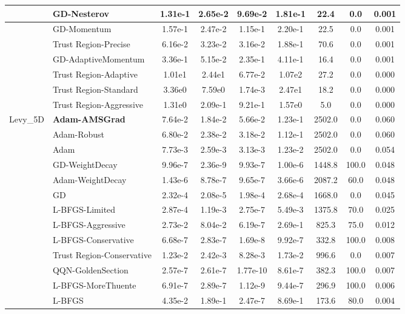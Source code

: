 \documentclass[10pt]{article}
\begin{document}
\begin{longtable}{|l|l|c|c|c|c|c|c|c|}
\hline
 & GD-Nesterov & 1.31e-1 & 2.65e-2 & 9.69e-2 & 1.81e-1 & 22.4 & 0.0 & 0.001 \\
\hline
 & GD-Momentum & 1.57e-1 & 2.47e-2 & 1.15e-1 & 2.20e-1 & 22.5 & 0.0 & 0.001 \\
\hline
 & Trust Region-Precise & 6.16e-2 & 3.23e-2 & 3.16e-2 & 1.88e-1 & 70.6 & 0.0 & 0.001 \\
\hline
 & GD-AdaptiveMomentum & 3.36e-1 & 5.15e-2 & 2.35e-1 & 4.11e-1 & 16.4 & 0.0 & 0.001 \\
\hline
 & Trust Region-Adaptive & 1.01e1 & 2.44e1 & 6.77e-2 & 1.07e2 & 27.2 & 0.0 & 0.000 \\
\hline
 & Trust Region-Standard & 3.36e0 & 7.59e0 & 1.74e-3 & 2.47e1 & 18.2 & 0.0 & 0.000 \\
\hline
 & Trust Region-Aggressive & 1.31e0 & 2.09e-1 & 9.21e-1 & 1.57e0 & 5.0 & 0.0 & 0.000 \\
Levy\_5D & \textbf{Adam-AMSGrad} & 7.64e-2 & 1.84e-2 & 5.66e-2 & 1.23e-1 & 2502.0 & 0.0 & 0.060 \\
\hline
 & Adam-Robust & 6.80e-2 & 2.38e-2 & 3.18e-2 & 1.12e-1 & 2502.0 & 0.0 & 0.060 \\
\hline
 & Adam & 7.73e-3 & 2.59e-3 & 3.13e-3 & 1.23e-2 & 2502.0 & 0.0 & 0.054 \\
\hline
 & GD-WeightDecay & 9.96e-7 & 2.36e-9 & 9.93e-7 & 1.00e-6 & 1448.8 & 100.0 & 0.048 \\
\hline
 & Adam-WeightDecay & 1.43e-6 & 8.78e-7 & 9.65e-7 & 3.66e-6 & 2087.2 & 60.0 & 0.048 \\
\hline
 & GD & 2.32e-4 & 2.08e-5 & 1.98e-4 & 2.68e-4 & 1668.0 & 0.0 & 0.045 \\
\hline
 & L-BFGS-Limited & 2.87e-4 & 1.19e-3 & 2.75e-7 & 5.49e-3 & 1375.8 & 70.0 & 0.025 \\
\hline
 & L-BFGS-Aggressive & 2.73e-2 & 8.04e-2 & 6.19e-7 & 2.69e-1 & 825.3 & 75.0 & 0.012 \\
\hline
 & L-BFGS-Conservative & 6.68e-7 & 2.83e-7 & 1.69e-8 & 9.92e-7 & 332.8 & 100.0 & 0.008 \\
\hline
 & Trust Region-Conservative & 1.23e-2 & 2.42e-3 & 8.28e-3 & 1.73e-2 & 996.6 & 0.0 & 0.007 \\
\hline
 & QQN-GoldenSection & 2.57e-7 & 2.61e-7 & 1.77e-10 & 8.61e-7 & 382.3 & 100.0 & 0.007 \\
\hline
 & L-BFGS-MoreThuente & 6.91e-7 & 2.89e-7 & 1.12e-9 & 9.44e-7 & 296.9 & 100.0 & 0.006 \\
\hline
 & L-BFGS & 4.35e-2 & 1.89e-1 & 2.47e-7 & 8.69e-1 & 173.6 & 80.0 & 0.004 \\

\end{longtable}
\end{document}
